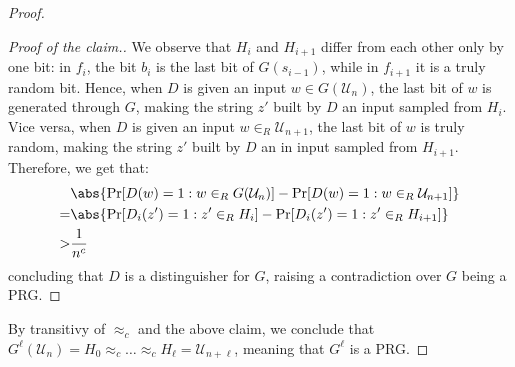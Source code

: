 \documentclass[a4paper, 12pt]{report}
\begin{document}
\begin{proof}
\begin{proof}[Proof of the claim.]
            We observe that $H_i$ and $H_{i+1}$ differ from each other only by one bit: in $f_i$, the bit $b_i$ is the last bit of $G(s_{i-1})$, while in $f_{i+1}$ it is a truly random bit. Hence, when $D$ is given an input $w \in G(\mathcal{U}_n)$, the last bit of $w$ is generated through $G$, making the string $z'$ built by $D$ an input sampled from $H_i$. Vice versa, when $D$ is given an input $w \in_R \mathcal{U}_{n+1}$, the last bit of $w$ is truly random, making the string $z'$ built by $D$ an in input sampled from $H_{i+1}$. Therefore, we get that:
            \[\begin{split}
                &\abs{\Pr[D(w) = 1 : w \in_R G(\mathcal{U}_n)] - \Pr[D(w) = 1 : w \in_R \mathcal{U}_{n+1}]}\\
                = &\abs{\Pr[D_i(z') = 1 : z' \in_R H_i] - \Pr[D_i(z') = 1 : z' \in_R H_{i+1}]} \\
                > &\frac{1}{n^c}
            \end{split}\]
            concluding that $D$ is a distinguisher for $G$, raising a contradiction over $G$ being a PRG.
        \end{proof}

        By transitivy of $\approx_c$ and the above claim, we conclude that $G^\ell(\mathcal{U}_n) = H_0 \approx_c \ldots \approx_c H_\ell = \mathcal{U}_{n+\ell}$, meaning that $G^\ell$ is a PRG.
    \end{proof}
\end{document}
